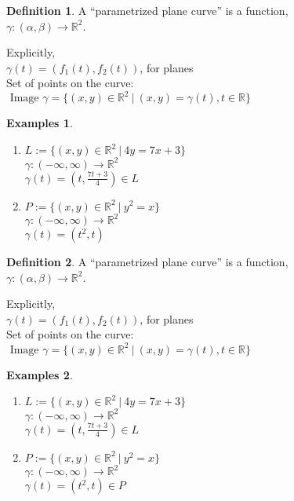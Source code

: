 \documentclass[twocolumn,20pt,fleqn]{extarticle}
\theoremstyle{plain}
\theoremstyle{definition}
\newtheorem*{definition}{Definition}
\newtheorem*{exmpls}{Examples}
\theoremstyle{remark}
\newenvironment*{examples}{\begin{exmpls} ~ \begin{enumerate}}{\end{enumerate}\end{exmpls}}
\begin{document}
\begin{definition}
  A  ``parametrized plane curve''  is a  function,\\ $\gamma  : (\alpha, \beta) \to \mathbb{R}^2$.
\end{definition}

Explicitly,\\
$\gamma(t) = (f_1(t), f_2(t))$, for planes\\

Set of points on the curve:\\  $\textrm{ Image } \gamma = \{(x,y) \in \mathbb{R}^2 \ |\ (x,y) = \gamma(t), t \in \mathbb{R}\}$




\begin{examples}
  \item $L:=\{(x,y) \in \mathbb{R}^2\ |\ 4y = 7x + 3\}$\\
  $\gamma  : (-\infty,\infty) \to \mathbb{R}^2$ \\
  $\gamma(t) = (t, \frac{7t+3}{4})  \in L$\\
  \item $P:=\{(x,y) \in \mathbb{R}^2\ |\ y^2 = x\}$\\
  $\gamma  : (-\infty,\infty) \to \mathbb{R}^2$ \\
  $\gamma(t) = (t^2, t) $\end{examples}


\clearpage




\begin{definition}
  A  ``parametrized plane curve''  is a  function,\\ $\gamma  : (\alpha, \beta) \to \mathbb{R}^2$.
\end{definition}

Explicitly,\\
$\gamma(t) = (f_1(t), f_2(t))$, for planes\\

Set of points on the curve:\\  $\textrm{ Image } \gamma = \{(x,y) \in \mathbb{R}^2 \ |\ (x,y) = \gamma(t), t \in \mathbb{R}\}$




\begin{examples}
  \item $L:=\{(x,y) \in \mathbb{R}^2\ |\ 4y = 7x + 3\}$\\
  $\gamma  : (-\infty,\infty) \to \mathbb{R}^2$ \\
  $\gamma(t) = (t, \frac{7t+3}{4})  \in L$\\
  \item $P:=\{(x,y) \in \mathbb{R}^2\ |\ y^2 = x\}$\\
  $\gamma  : (-\infty,\infty) \to \mathbb{R}^2$ \\
  $\gamma(t) = (t^2, t)  \in P$\\\end{examples}
\end{document}
